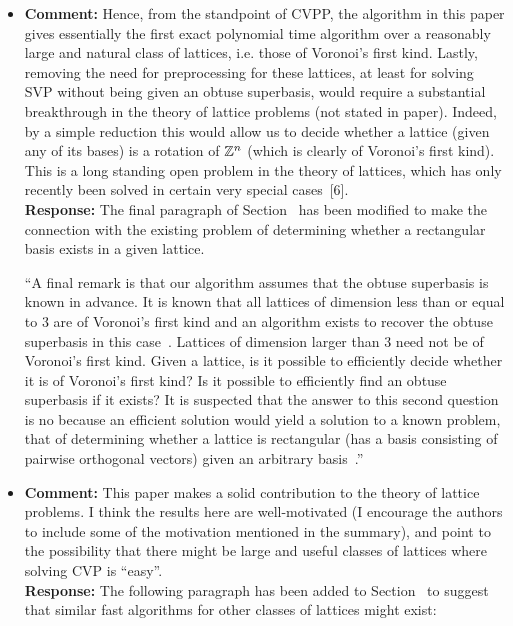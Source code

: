 \documentclass[a4paper,10pt]{article}
\begin{document}
\begin{itemize}
\item\textbf{Comment:} 
Hence, from the standpoint of CVPP, the algorithm in this paper gives essentially the first
exact polynomial time algorithm over a reasonably large and natural class of lattices, i.e. those
of Voronoi's first kind. Lastly, removing the need for preprocessing for these lattices, at least for
solving SVP without being given an obtuse superbasis, would require a substantial breakthrough
in the theory of lattice problems (not stated in paper). Indeed, by a simple reduction this would
allow us to decide whether a lattice (given any of its bases) is a rotation of ${\mathbb Z}^n$ (which is clearly
of Voronoi's first kind). This is a long standing open problem in the theory of lattices, which has
only recently been solved in certain very special cases~[6].
\\\textbf{Response:}
The final paragraph of Section~ has been modified to make the connection with the existing problem of determining whether a rectangular basis exists in a given lattice.

``A final remark is that our algorithm assumes that the obtuse superbasis is known in advance.  It is known that all lattices of dimension less than or equal to 3 are of Voronoi's first kind and an algorithm exists to recover the obtuse superbasis in this case~\cite{SPLAG}.  Lattices of dimension larger than 3 need not be of Voronoi's first kind.  Given a lattice, is it possible to efficiently decide whether it is of Voronoi's first kind?  Is it possible to efficiently find an obtuse superbasis if it exists?  It is suspected that the answer to this second question is no because an efficient solution would yield a solution to a known problem, that of determining whether a lattice is rectangular (has a basis consisting of pairwise orthogonal vectors) given an arbitrary basis~\cite{Lenstra_Silverberg_revisting_gentra_szydlo_2014}.''  %


\item\textbf{Comment:} 
This paper makes a solid contribution to the theory of lattice problems. I think the results here are
well-motivated (I encourage the authors to include some of the motivation mentioned in the summary), and point to the possibility that there might be large and useful classes of lattices where
solving CVP is “easy”.
\\\textbf{Response:}
The following paragraph has been added to Section~ to suggest that similar fast algorithms for other classes of lattices might exist:


\end{itemize}
\end{document}
